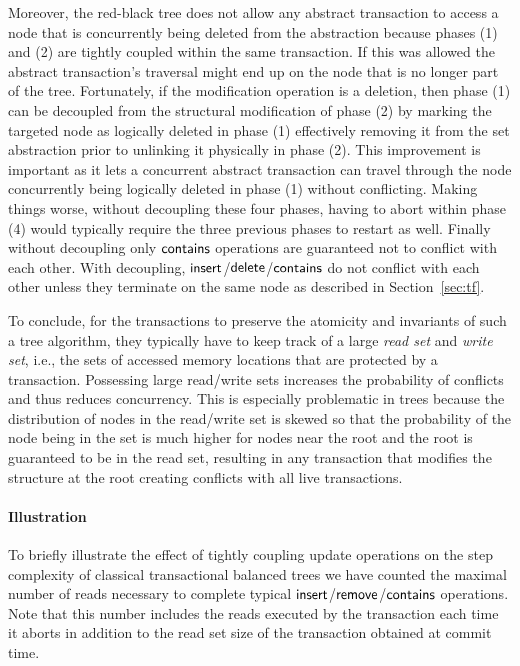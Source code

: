 Moreover, the red-black tree does not allow any abstract transaction to access a node that is concurrently being deleted from the abstraction because
phases (1) and (2) are tightly coupled within the same transaction.
If this was allowed the abstract transaction's traversal might end up on the node that is no longer part of the tree.
Fortunately, if the modification operation is a deletion, then phase (1) can be decoupled from the structural modification of phase (2)
by marking the targeted node as logically deleted in phase (1) effectively removing it from the set abstraction prior to unlinking it physically in phase (2).
This improvement is important as it lets a concurrent abstract transaction can travel through the node concurrently being logically deleted in phase (1) without conflicting.
Making things worse, without decoupling these four phases, having to abort within phase (4) would typically require the three previous phases 
to restart as well. 
Finally without decoupling only $\act{contains}$ operations are guaranteed not to conflict with each other.
With decoupling, $\act{insert}$/$\act{delete}$/$\act{contains}$ do not conflict with each other unless they terminate on the same node as described in Section~\ref{sec:tf}.

To conclude, for the transactions to preserve the atomicity and invariants of such a tree algorithm, they typically have to 
keep track of a large \emph{read set} and \emph{write set}, 
i.e., the sets of accessed memory locations that are protected by a transaction. 
Possessing large read/write sets increases the probability of conflicts and thus reduces concurrency.
This is especially problematic
in trees because the distribution of nodes in the read/write set is skewed so that the
probability of the node being in the set is much higher for nodes near the root and the root is guaranteed to be in the read set,
resulting in any transaction that modifies the structure at the root creating conflicts with all live transactions.

\paragraph{Illustration}

To briefly illustrate the effect of tightly coupling update operations on the step complexity of classical transactional balanced trees
we have counted the maximal number of reads necessary to complete typical $\lit{insert}$/$\lit{remove}$/$\lit{contains}$ operations.
Note that this number includes the reads executed by the transaction each time it aborts in addition to the read set size of the transaction obtained at commit time.

